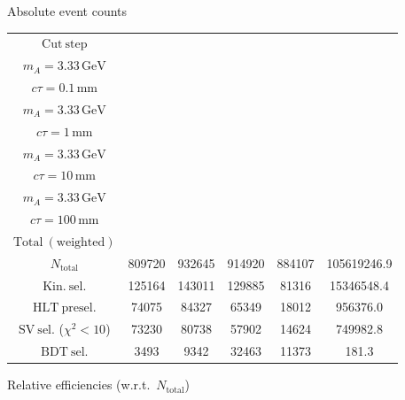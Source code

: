 \documentclass[10pt,a4paper]{article}
\renewcommand{\arraystretch}{1.4}
\begin{document}
{\footnotesize\setlength{\tabcolsep}{4pt}\renewcommand{\arraystretch}{1.05}%
\vspace{12pt}

Absolute event counts

\begin{tabular}{cccccc}
\toprule
$\mathrm{Cut\ step}$ & \shortstack{$m_{\pi}=10\,\mathrm{GeV}$\\$m_{A}=3.33\,\mathrm{GeV}$\\$c\tau=0.1\,\mathrm{mm}$} & \shortstack{$m_{\pi}=10\,\mathrm{GeV}$\\$m_{A}=3.33\,\mathrm{GeV}$\\$c\tau=1\,\mathrm{mm}$} & \shortstack{$m_{\pi}=10\,\mathrm{GeV}$\\$m_{A}=3.33\,\mathrm{GeV}$\\$c\tau=10\,\mathrm{mm}$} & \shortstack{$m_{\pi}=10\,\mathrm{GeV}$\\$m_{A}=3.33\,\mathrm{GeV}$\\$c\tau=100\,\mathrm{mm}$} & \shortstack{$\mathrm{QCD}$\\$\mathrm{Total\ (weighted)}$} \\
\midrule
$N_{\mathrm{total}}$ & 809720 & 932645 & 914920 & 884107 & 105619246.9\\
$\mathrm{Kin.\ sel.}$ & 125164 & 143011 & 129885 & 81316 & 15346548.4\\
$\mathrm{HLT\ presel.}$ & 74075 & 84327 & 65349 & 18012 & 956376.0\\
$\mathrm{SV\ sel.}$ ($\chi^2{<}10$) & 73230 & 80738 & 57902 & 14624 & 749982.8\\
$\mathrm{BDT\ sel.}$ & 3493 & 9342 & 32463 & 11373 & 181.3\\
\bottomrule
\end{tabular}

\vspace{18pt}

Relative efficiencies (w.r.t.\ $N_{\mathrm{total}}$)

}
\end{document}
